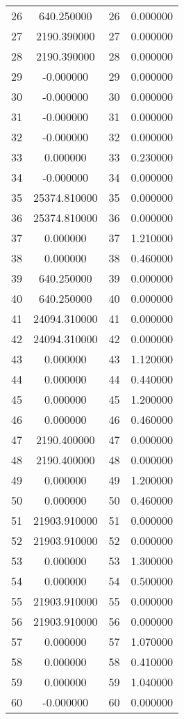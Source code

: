\documentclass[12pt]{article}
\begin{document}
\begin{longtable}{@{}cccc@{}}
26 & 640.250000 & 26 & 0.000000 \\
27 & 2190.390000 & 27 & 0.000000 \\
28 & 2190.390000 & 28 & 0.000000 \\
29 & -0.000000 & 29 & 0.000000 \\
30 & -0.000000 & 30 & 0.000000 \\
31 & -0.000000 & 31 & 0.000000 \\
32 & -0.000000 & 32 & 0.000000 \\
33 & 0.000000 & 33 & 0.230000 \\
34 & -0.000000 & 34 & 0.000000 \\
35 & 25374.810000 & 35 & 0.000000 \\
36 & 25374.810000 & 36 & 0.000000 \\
37 & 0.000000 & 37 & 1.210000 \\
38 & 0.000000 & 38 & 0.460000 \\
39 & 640.250000 & 39 & 0.000000 \\
40 & 640.250000 & 40 & 0.000000 \\
41 & 24094.310000 & 41 & 0.000000 \\
42 & 24094.310000 & 42 & 0.000000 \\
43 & 0.000000 & 43 & 1.120000 \\
44 & 0.000000 & 44 & 0.440000 \\
45 & 0.000000 & 45 & 1.200000 \\
46 & 0.000000 & 46 & 0.460000 \\
47 & 2190.400000 & 47 & 0.000000 \\
48 & 2190.400000 & 48 & 0.000000 \\
49 & 0.000000 & 49 & 1.200000 \\
50 & 0.000000 & 50 & 0.460000 \\
51 & 21903.910000 & 51 & 0.000000 \\
52 & 21903.910000 & 52 & 0.000000 \\
53 & 0.000000 & 53 & 1.300000 \\
54 & 0.000000 & 54 & 0.500000 \\
55 & 21903.910000 & 55 & 0.000000 \\
56 & 21903.910000 & 56 & 0.000000 \\
57 & 0.000000 & 57 & 1.070000 \\
58 & 0.000000 & 58 & 0.410000 \\
59 & 0.000000 & 59 & 1.040000 \\
60 & -0.000000 & 60 & 0.000000 \\

\end{longtable}
\end{document}

